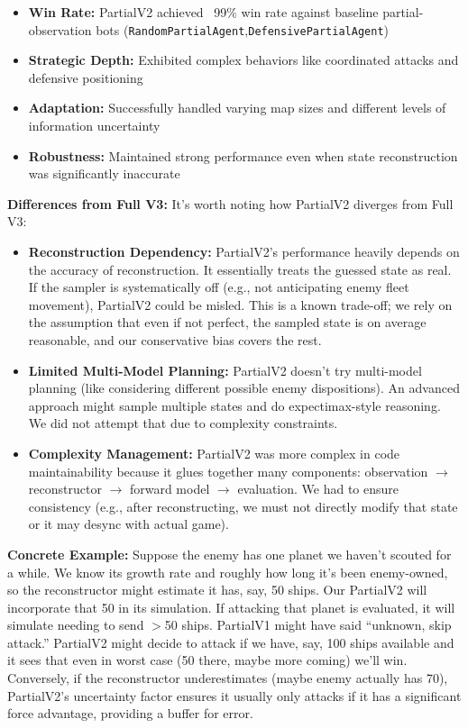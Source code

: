 \documentclass[conference]{IEEEtran}
\begin{document}
\begin{itemize}
\item \textbf{Win Rate:} PartialV2 achieved ~99\% win rate against baseline partial-observation bots (\texttt{RandomPartialAgent},\linebreak \texttt{DefensivePartialAgent})
\item \textbf{Strategic Depth:} Exhibited complex behaviors like coordinated attacks and defensive positioning
\item \textbf{Adaptation:} Successfully handled varying map sizes and different levels of information uncertainty
\item \textbf{Robustness:} Maintained strong performance even when state reconstruction was significantly inaccurate
\end{itemize}

\textbf{Differences from Full V3:} It's worth noting how PartialV2 diverges from Full V3:

\begin{itemize}
\item \textbf{Reconstruction Dependency:} PartialV2's performance heavily depends on the accuracy of reconstruction. It essentially treats the guessed state as real. If the sampler is systematically off (e.g., not anticipating enemy fleet movement), PartialV2 could be misled. This is a known trade-off; we rely on the assumption that even if not perfect, the sampled state is on average reasonable, and our conservative bias covers the rest.

\item \textbf{Limited Multi-Model Planning:} PartialV2 doesn't try multi-model planning (like considering different possible enemy dispositions). An advanced approach might sample multiple states and do expectimax-style reasoning. We did not attempt that due to complexity constraints.

\item \textbf{Complexity Management:} PartialV2 was more complex in code maintainability because it glues together many components: observation $\rightarrow$ reconstructor $\rightarrow$ forward model $\rightarrow$ evaluation. We had to ensure consistency (e.g., after reconstructing, we must not directly modify that state or it may desync with actual game).
\end{itemize}

\textbf{Concrete Example:} Suppose the enemy has one planet we haven't scouted for a while. We know its growth rate and roughly how long it's been enemy-owned, so the reconstructor might estimate it has, say, 50 ships. Our PartialV2 will incorporate that 50 in its simulation. If attacking that planet is evaluated, it will simulate needing to send $>$50 ships. PartialV1 might have said ``unknown, skip attack.'' PartialV2 might decide to attack if we have, say, 100 ships available and it sees that even in worst case (50 there, maybe more coming) we'll win. Conversely, if the reconstructor underestimates (maybe enemy actually has 70), PartialV2's uncertainty factor ensures it usually only attacks if it has a significant force advantage, providing a buffer for error.
\end{document}
